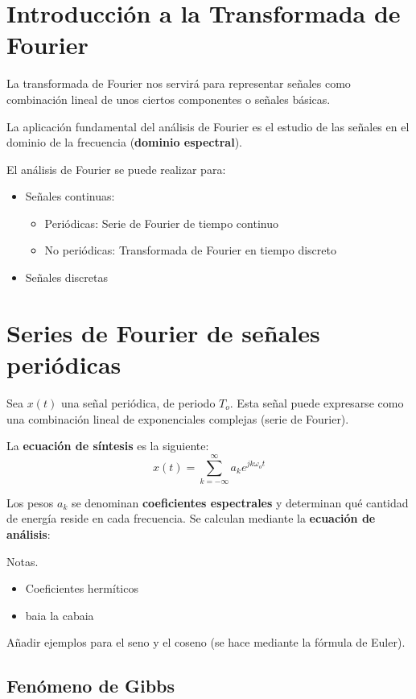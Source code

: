 \documentclass[a4paper]{book}
\begin{document}
\section{Introducción a la Transformada de Fourier}

La transformada de Fourier nos servirá para representar señales como combinación lineal de unos ciertos componentes o señales básicas.

La aplicación fundamental del análisis de Fourier es el estudio de las señales en el dominio de la frecuencia (\textbf{dominio espectral}).

El análisis de Fourier se puede realizar para:
\begin{itemize}
	\item Señales continuas:
	      \begin{itemize}
		      \item Periódicas: Serie de Fourier de tiempo continuo
		      \item No periódicas: Transformada de Fourier en tiempo discreto
	      \end{itemize}
	\item Señales discretas
\end{itemize}

\section{Series de Fourier de señales periódicas}
Sea $x(t)$ una señal periódica, de periodo $T_o$. Esta señal puede expresarse como una combinación lineal de exponenciales complejas (serie de Fourier).

La \textbf{ecuación de síntesis} es la siguiente:
\begin{equation}
	x(t) = \sum_{k=-\infty}^{\infty}a_k e^{jk\omega _o t}
\end{equation}

Los pesos $a_k$ se denominan \textbf{coeficientes espectrales} y determinan qué cantidad de energía reside en cada frecuencia. Se calculan mediante la \textbf{ecuación de análisis}:
\[  \]

Notas.
\begin{itemize}
	\item Coeficientes hermíticos
	\item baia la cabaia
\end{itemize}

Añadir ejemplos para el seno y el coseno (se hace mediante la fórmula de Euler).

\subsection{Fenómeno de Gibbs}
\end{document}

